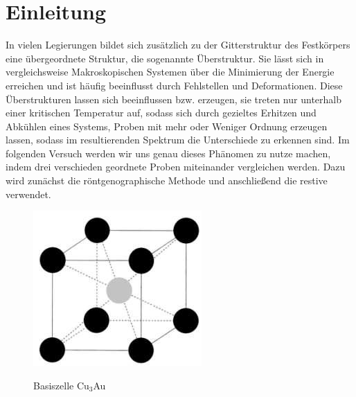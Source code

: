 \section{Einleitung}
    In vielen Legierungen bildet sich zusätzlich zu der Gitterstruktur des Festkörpers eine übergeordnete
    Struktur, die sogenannte Überstruktur. Sie lässt sich in vergleichsweise Makroskopischen Systemen
    über die Minimierung der Energie erreichen und ist häufig beeinflusst durch Fehlstellen und Deformationen.
    Diese Überstrukturen lassen sich beeinflussen bzw. erzeugen, sie treten nur unterhalb einer kritischen
    Temperatur auf, sodass sich durch gezieltes Erhitzen und Abkühlen eines Systems, Proben mit mehr
    oder Weniger Ordnung erzeugen lassen, sodass im resultierenden Spektrum die Unterschiede zu erkennen sind.
    Im folgenden Versuch werden wir uns genau dieses Phänomen zu nutze machen, indem drei verschieden geordnete
    Proben miteinander vergleichen werden. Dazu wird zunächst die röntgenographische Methode und anschließend
    die restive verwendet.

    \begin{figure}[H]
        \centering
        \includegraphics{images/einleitung_hurensohn.jpg}
        \label{einleitung}
        \caption{Basiszelle Cu$_3$Au}
    \end{figure}